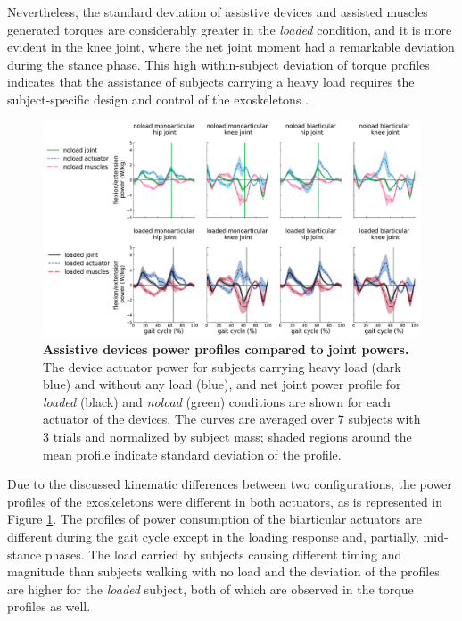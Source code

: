 \documentclass[10pt,letterpaper]{article}
\begin{document}
Nevertheless, the standard deviation of assistive devices and assisted muscles generated torques are considerably greater in the \textit{loaded} condition, and it is more evident in the knee joint, where the net joint moment had a remarkable deviation during the stance phase. This high within-subject deviation of torque profiles indicates that the assistance of subjects carrying a heavy load requires the subject-specific design and control of the exoskeletons \cite{2}.\\
\begin{figure}[ht]   
	\centering
	\includegraphics[width=\linewidth]{Ideal_Exo_MonovsBi_Figures/PaperFigure_Exoskeletons_Power.pdf}
	\vspace{1mm}
	\caption{{\small\textbf{Assistive devices power profiles compared to joint powers.} The device actuator power for subjects carrying heavy load (dark blue) and without any load (blue), and net joint power profile for \textit{loaded} (black) and \textit{noload} (green) conditions are shown for each actuator of the devices. The curves are averaged over 7 subjects with 3 trials and normalized by subject mass; shaded regions around the mean profile indicate standard deviation of the profile.}}
	\label{Fig_IdealExo_Power}
\end{figure}
Due to the discussed kinematic differences between two configurations, the power profiles of the exoskeletons were different in both actuators, as is represented in Figure \ref{Fig_IdealExo_Power}. The profiles of power consumption of the biarticular actuators are different during the gait cycle except in the loading response and, partially, mid-stance phases. The load carried by subjects causing different timing and magnitude than subjects walking with no load and the deviation of the profiles are higher for the \textit{loaded} subject, both of which are observed in the torque profiles as well.\\
\end{document}

